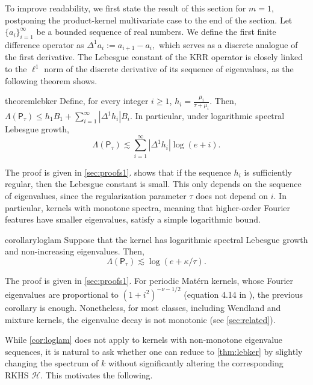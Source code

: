 \documentclass{article}
\let\cite\citep
\numberwithin{theorem}{section}
\theoremstyle{definition}
\newcommand{\Hs}{\mathcal H}
\begin{document}

To improve readability, we first state the result of this section for $m=1$, postponing the product-kernel multivariate case to the end of the section.
Let $\{a_i\}_{i=1}^\infty$ be a bounded sequence of real numbers. We define the first finite difference operator as
$\Delta^1 a_i := a_{i+1} - a_i,$
which serves as a discrete analogue of the first derivative. The Lebesgue constant of the KRR operator is closely linked to the $\ell^1$ norm of the discrete derivative of its sequence of eigenvalues, as the following theorem shows.
\begin{restatable}{theorem}{lebker}\label{thm:lebker}
    Define, for every integer $i\ge 1$, $h_i=\frac{\mu_i}{\tau+\mu_i}$. Then, $\Lambda(\mathsf{P}_{\tau})\le h_1B_1+\sum_{i=1}^\infty \left|\Delta^1h_i\right|B_i$.
    In particular, under logarithmic spectral Lebesgue growth,
    $$\Lambda(\mathsf{P}_{\tau})\lesssim \sum_{i=1}^\infty \left|\Delta^1h_i\right|\log(e+i).$$
\end{restatable}
The proof is given in \cref{sec:proofs1}.
 shows that if the sequence $h_i$ is sufficiently regular, then the Lebesgue constant is small. This only depends on the sequence of eigenvalues, since the regularization parameter $\tau$ does not depend on $i$. In particular, kernels with monotone spectra, meaning that higher-order Fourier features have smaller eigenvalues, satisfy a simple logarithmic bound.
\begin{restatable}{corollary}{loglam}\label{cor:loglam}
    Suppose that the kernel has logarithmic spectral Lebesgue growth and non-increasing eigenvalues. Then,
    $$\Lambda(\mathsf{P}_{\tau})\lesssim \log(e+\kappa /\tau).$$
\end{restatable}
The proof is given in \cref{sec:proofs1}.
For periodic Mat\'ern kernels, whose Fourier eigenvalues are proportional to $(1+i^2)^{-\nu-1/2}$ (equation 4.14 in \cite{seeger2004gaussian}), the previous corollary is enough. Nonetheless, for most classes, including Wendland and mixture kernels, the eigenvalue decay is not monotonic (see \cref{sec:related}).

While \cref{cor:loglam} does not apply to kernels with non-monotone eigenvalue sequences, it is natural to ask whether one can reduce to \cref{thm:lebker} by slightly changing the spectrum of $k$ without significantly altering the corresponding RKHS $\Hs$.
This motivates the following.
\end{document}
